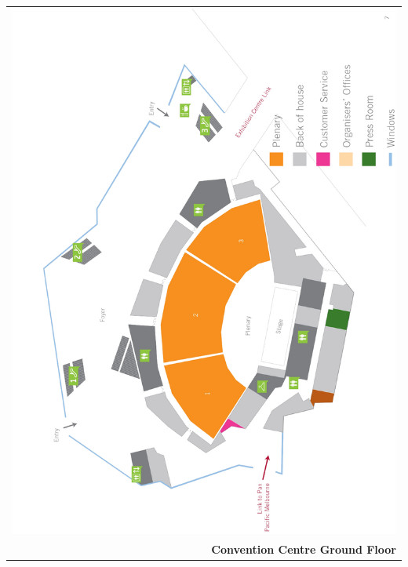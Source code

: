 \pagebreak
\thispagestyle{empty}
\begin{center}
  \begin{tabular}{r}
    \includegraphics[width=\textwidth]{content/maps/mcec_floor1.pdf} \\[3em]
    {\Large \textbf{Convention Centre Ground Floor}} %
  \end{tabular}
\end{center}

